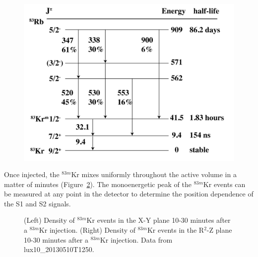 \begin{figure} [!h]
\includegraphics[scale=.35]{Kr83Decay.png} 
\label{KrDecayScheme}
\end{figure}

Once injected, the $^{83m}$Kr mixes uniformly throughout the active volume in a matter of minutes (Figure~\ref{fig:KrMixing}). The monoenergetic peak of the $^{83m}$Kr events can be measured at any point in the detector to determine the position dependence of the S1 and S2 signals.

\begin{figure} 
\centering
{}
\qquad
{}
\caption{ (Left) Density of $^{83m}$Kr events in the X-Y plane 10-30 minutes after a $^{83m}$Kr injection. (Right) Density of $^{83m}$Kr events in the R$^2$-Z plane 10-30 minutes after a $^{83m}$Kr injection.  Data from lux10\_20130510T1250. }
\label{fig:KrMixing}
\end{figure}

